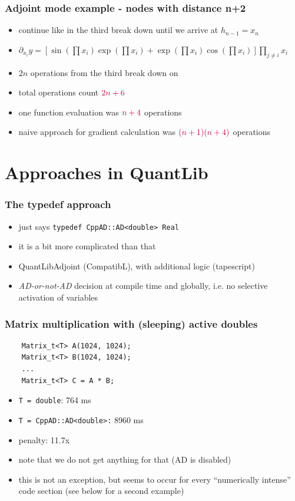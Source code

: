\documentclass[10pt,German]{beamer}
\begin{document}
\begin{frame}[fragile]
\frametitle{Adjoint mode example - nodes with distance n+2}
\begin{itemize}
\item continue like in the third break down until we arrive at $h_{n-1} = x_n$
\item $\partial_{x_i} y = \left[\sin(\prod x_i)\exp(\prod x_i)+\exp(\prod x_i)\cos(\prod x_i)\right] \prod_{j\neq i} x_i$
\item $2n$ operations from the third break down on
\item total operations count $\textcolor{purple}{2n+6}$
\item one function evaluation was $\textcolor{purple}{n+4}$ operations
\item naive approach for gradient calculation was $\textcolor{purple}{(n+1)(n+4)}$ operations
\end{itemize}
\end{frame}

\section{Approaches in QuantLib}

\begin{frame}[fragile]
\frametitle{The typedef approach}
\begin{itemize}
\item just says \verb+typedef CppAD::AD<double> Real+
\item it is a bit more complicated than that
\item QuantLibAdjoint (CompatibL), with additional logic (tapescript)
\item \textit{AD-or-not-AD} decision at compile time and globally, i.e. no selective activation of variables
\end{itemize}
\end{frame}

\begin{frame}[fragile]
\frametitle{Matrix multiplication with (sleeping) active doubles}
\begin{verbatim}
    Matrix_t<T> A(1024, 1024);
    Matrix_t<T> B(1024, 1024);
    ...
    Matrix_t<T> C = A * B;
\end{verbatim}
\begin{itemize}
\item \verb+T = double+: 764 ms
\item \verb+T = CppAD::AD<double>:+ 8960 ms
\item penalty: 11.7x
\item note that we do not get anything for that (AD is disabled)
\item this is not an exception, but seems to occur for every ``numerically intense'' code section (see below for a second example)
\end{itemize}
\end{frame}
\end{document}
